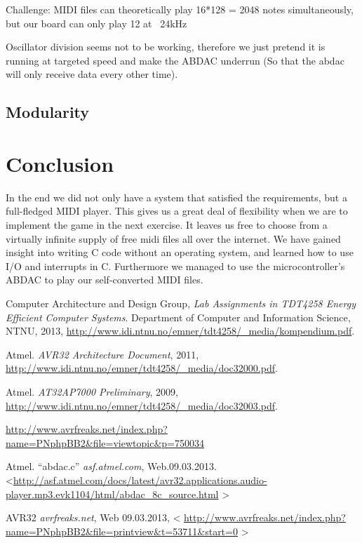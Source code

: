\documentclass[a4paper,12pt]{article}
\begin{document}
Challenge: MIDI files can theoretically play 16*128 = 2048 notes simultaneously, but our board can only play 12 at ~24kHz

Oscillator division seems not to be working, therefore we just pretend it is running at targeted speed and make the ABDAC underrun (So that the abdac will only receive data every other time).

\subsection{Modularity}



\clearpage
\section{Conclusion}
In the end we did not only have a system that satisfied the requirements, but a full-fledged MIDI player. This gives us a great deal of flexibility when we are to implement the game in the next exercise. It leaves us free to choose from a virtually infinite supply of free midi files all over the internet.
We have gained insight into writing C code without an operating system, and learned how to use I/O and interrupts in C. Furthermore we managed to use the microcontroller’s ABDAC to play our self-converted MIDI files.

\clearpage

\begin{thebibliography}{9}

Computer Architecture and Design Group,
\emph{Lab Assignments in TDT4258 Energy Efficient Computer Systems}.
Department of Computer and Information Science, NTNU,
2013,
\url{http://www.idi.ntnu.no/emner/tdt4258/\_media/kompendium.pdf}.

Atmel.
\emph{AVR32 Architecture Document},
2011,
\url{http://www.idi.ntnu.no/emner/tdt4258/\_media/doc32000.pdf}.

Atmel.
\emph{AT32AP7000 Preliminary},
2009,
\url{http://www.idi.ntnu.no/emner/tdt4258/\_media/doc32003.pdf}.

\url{http://www.avrfreaks.net/index.php?name=PNphpBB2&file=viewtopic&p=750034}

Atmel. “abdac.c”
\emph{asf.atmel.com},
Web.09.03.2013.
\textless \url{http://asf.atmel.com/docs/latest/avr32.applications.audio-player.mp3.evk1104/html/abdac_8c_source.html}
\textgreater

AVR32
\emph{avrfreaks.net},
Web 09.03.2013,
\textless
\url{http://www.avrfreaks.net/index.php?name=PNphpBB2&file=printview&t=53711&start=0}
\textgreater

\end{thebibliography}
\end{document}
